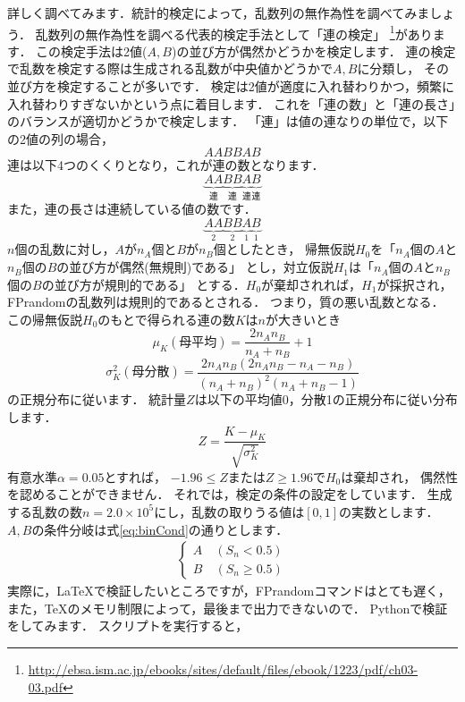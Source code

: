 詳しく調べてみます．統計的検定によって，乱数列の無作為性を調べてみましょう．
乱数列の無作為性を調べる代表的検定手法として「連の検定」
\footnote{\url{http://ebsa.ism.ac.jp/ebooks/sites/default/files/ebook/1223/pdf/ch03-03.pdf}}があります．
この検定手法は2値($A,B$)の並び方が偶然かどうかを検定します．
連の検定で乱数を検定する際は生成される乱数が中央値かどうかで$A,B$に分類し，
その並び方を検定することが多いです．
検定は2値が適度に入れ替わりかつ，頻繁に入れ替わりすぎないかという点に着目します．
これを「連の数」と「連の長さ」のバランスが適切かどうかで検定します．
「連」は値の連なりの単位で，以下の2値の列の場合，
\[
AABBAB
\]
連は以下4つのくくりとなり，これが連の数となります．
\[
\underbrace{AA}_{\text{連}}
\underbrace{BB}_{\text{連}}
\underbrace{A}_{\text{連}}
\underbrace{B}_{\text{連}}
\]
また，連の長さは連続している値の数です．
\[
\underbrace{AA}_2
\underbrace{BB}_2
\underbrace{A}_1
\underbrace{B}_1
\]
$n$個の乱数に対し，$A$が$n_A$個と$B$が$n_B$個としたとき，
帰無仮説$H_0$を「$n_A$個の$A$と$n_B$個の$B$の並び方が偶然(無規則)である」
とし，対立仮説$H_1$は「$n_A$個の$A$と$n_B$個の$B$の並び方が規則的である」
とする．$H_0$が棄却されれば，$H_1$が採択され，FPrandomの乱数列は規則的であるとされる．
つまり，質の悪い乱数となる．
この帰無仮説$H_0$のもとで得られる連の数$K$は$n$が大きいとき
\[
\mu_K(\text{母平均}) = \dfrac{2n_An_B}{n_A + n_B} + 1
\]
\[
\sigma_K^2(母分散) = \dfrac{2n_An_B(2n_An_B - n_A - n_B)}{(n_A + n_B)^2(n_A + n_B - 1)}
\]
の正規分布に従います．
統計量$Z$は以下の平均値0，分散1の正規分布に従い分布します．
\[
Z = \dfrac{K - \mu_K}{\sqrt{\sigma_K^2}}
\]
有意水準$\alpha = 0.05$とすれば，
$-1.96 \leq Z$または$Z \geq 1.96$で$H_0$は棄却され，
偶然性を認めることができません．
それでは，検定の条件の設定をしています．
生成する乱数の数$n = 2.0 \times 10^5$にし，乱数の取りうる値は$[0,1]$の実数とします．
$A,B$の条件分岐は式\eqref{eq:binCond}の通りとします．
\begin{align}
  \begin{cases}
    A\quad(S_n < 0.5) \\
    B\quad(S_n \geq 0.5)
  \end{cases}\label{eq:binCond}
\end{align}
実際に，\LaTeX で検証したいところですが，FPrandomコマンドはとても遅く，
また，\TeX のメモリ制限によって，最後まで出力できないので．
Pythonで検証をしてみます．
{
}
{
}
スクリプトを実行すると，
